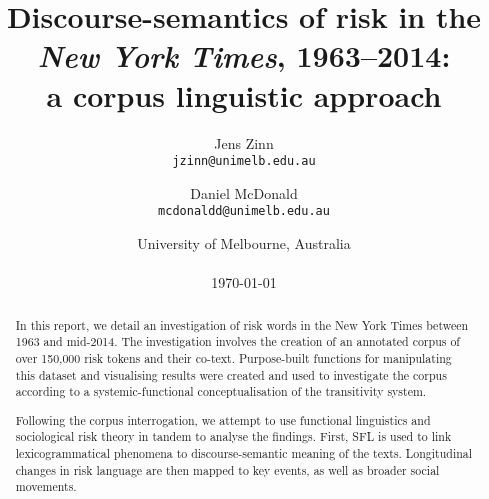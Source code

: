 \documentclass{report}
\title{Discourse-semantics of risk in the \emph{New York Times}, 1963--2014: \\ a corpus linguistic approach}
\author{
	Jens Zinn\\
	\texttt{jzinn@unimelb.edu.au}
	\and
	Daniel McDonald\\
	\texttt{mcdonaldd@unimelb.edu.au}\\
	}
\date{University of Melbourne, Australia\\
	~\\
	\today}
\begin{document}
		

	\renewcommand{\abstractname}{Summary}

	\maketitle

\begin{abstract}

	\noindent   In this report, we detail an investigation of risk words in the New York Times between 1963 and mid-2014. The investigation involves the creation of an annotated corpus of over 150,000 risk tokens and their co-text. Purpose-built functions for manipulating this dataset and visualising results were created and used to investigate the corpus according to a systemic-functional conceptualisation of the transitivity system.

             Following the corpus interrogation, we attempt to use functional linguistics and sociological risk theory in tandem to analyse the findings. First, SFL is used to link lexicogrammatical phenomena to discourse-semantic meaning of the texts. Longitudinal changes in risk language are then mapped to key events, as well as broader social movements.

	\end{abstract}
	\cleardoublepage
	\singlespacing
	\tableofcontents
	\onehalfspacing
	\cleardoublepage












	\cleardoublepage
	\singlespacing
	\printendnotes
	\cleardoublepage
	\singlespacing
	
	
	\cleardoublepage

	
\end{document}
